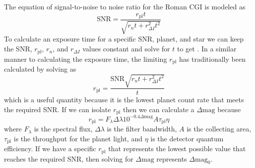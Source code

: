 The equation of signal-to-noise to noise ratio for the Roman CGI is modeled as
\begin{equation}
  \textrm{SNR} = \frac{r_\textrm{pl}t}{\sqrt{r_n t + r^2_{\Delta I} t^2}}
  \label{eq:2020SNR}
\end{equation}
To calculate an exposure time for a specific SNR, planet, and star we can keep
the SNR, $r_\textrm{pl}$, $r_n$, and $r_{\Delta I}$ values constant and solve
for $t$ to get .
In a similar manner to calculating the
exposure time, the limiting $r_\textrm{pl}$ has traditionally been calculated
by solving  as
\begin{equation}
  r_\textrm{pl} = \frac{\textrm{SNR} \sqrt{r_n t + r^2_{\Delta I} t^2}}{t}
  \label{eq:2020rpl}
\end{equation}
which is a useful quantity because it is the lowest planet count rate that meets
the required SNR. If we can isolate $r_\textrm{pl}$ then we can calculate a
$\Delta\textrm{mag}$ because
\begin{equation}
  r_\textrm{pl} = F_\lambda \Delta \lambda 10^{-0.4 \Delta \textrm{mag}} A \tau_\textrm{pl} \eta
  \label{eq:2020rpl_expand}
\end{equation}
where $F_\lambda$ is the spectral flux, $\Delta \lambda$ is the filter
bandwidth, $A$ is the collecting area, $\tau_\textrm{pl}$ is the throughput for
the planet light, and $\eta$ is the detector quantum efficiency. If we have a
specific $r_\textrm{pl}$ that represents the lowest possible value that reaches
the required SNR, then solving  for
$\Delta\textrm{mag}$ represents $\Delta\textrm{mag}_0$.

